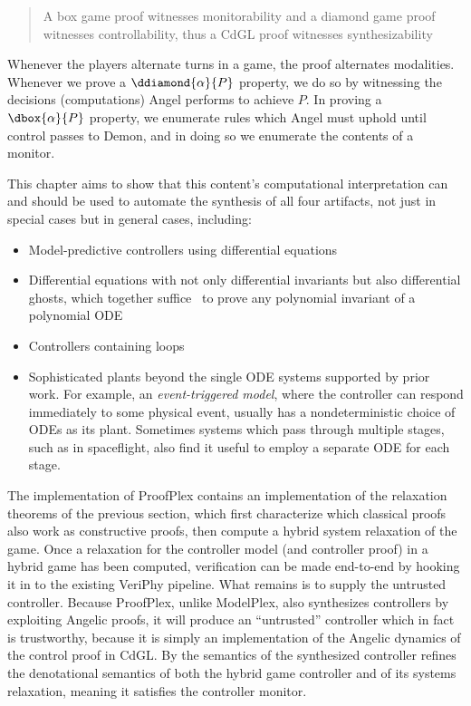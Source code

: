 \documentclass[12pt]{cmuthesis}
\theoremstyle{definition}
\theoremstyle{remark}
\newcommand{\rref}[2][]{\prettyref{#2}}
\newcommand{\CdGL}{\textsf{CdGL}\xspace}
\newcommand{\ProofPlex}{ProofPlex\xspace}
\newcommand{\VeriPhy}{VeriPhy\xspace}
\newcommand{\ModelPlex}{ModelPlex\xspace}
\begin{document}
\begin{framed}
  \begin{quote}
A box game proof witnesses monitorability and a diamond game proof witnesses controllability, thus a \CdGL proof witnesses synthesizability
  \end{quote}
\end{framed}

Whenever the players alternate turns in a game, the proof alternates modalities.
Whenever we prove a $\ddiamond{\alpha}{P}$ property, we do so by witnessing the decisions (computations) Angel performs to achieve $P$.
In proving a $\dbox{\alpha}{P}$ property, we enumerate rules which Angel must uphold until control passes to Demon, and in doing so we enumerate the contents of a monitor.

This chapter aims to show that this content's computational interpretation can and should be used to automate the synthesis of all four artifacts, not just in special cases but in general cases, including:
\begin{itemize}
\item Model-predictive controllers using differential equations
\item Differential equations with not only differential invariants but also differential ghosts, which together suffice~\cite{DBLP:conf/lics/PlatzerT18} to prove any polynomial invariant of a polynomial ODE
\item Controllers containing loops
\item Sophisticated plants beyond the single ODE systems supported by prior work.
For example, an \emph{event-triggered model}, where the controller can respond immediately to some physical event, usually has a nondeterministic choice of ODEs as its plant.
Sometimes systems which pass through multiple stages, such as in spaceflight, also find it useful to employ a separate ODE for each stage.
\end{itemize}

The implementation of \ProofPlex contains an implementation of the relaxation theorems of the previous section, which first characterize which classical proofs also work as constructive proofs, then compute a hybrid system relaxation of the game.
Once a relaxation for the controller model (and controller proof) in a hybrid game has been computed, verification can be made end-to-end by hooking it in to the existing \VeriPhy pipeline.
What remains is to supply the untrusted controller.
Because \ProofPlex, unlike \ModelPlex, also synthesizes controllers by exploiting Angelic proofs, it will produce an ``untrusted'' controller which in fact is trustworthy, because it is simply an implementation of the Angelic dynamics of the control proof in \CdGL.
By \rref{ch:cdgl} the semantics of the synthesized controller refines the denotational semantics of both the hybrid game controller and of its systems relaxation, meaning it satisfies the controller monitor.
\end{document}

